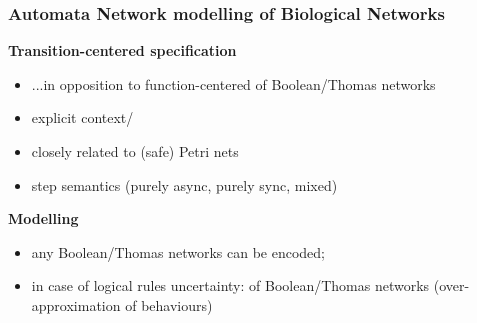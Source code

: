 \begin{frame}
\frametitle{Automata Network modelling of Biological Networks}
\textbf{Transition-centered specification}
\begin{itemize}
\item ...in opposition to function-centered of Boolean/Thomas networks
\item explicit context/ 
\item closely related to (safe) Petri nets
\item step semantics (purely async, purely sync, mixed)
\end{itemize}
\textbf{Modelling}
\begin{itemize}
\item any Boolean/Thomas networks can be encoded;
\item in case of logical rules uncertainty:  of Boolean/Thomas networks (over-approximation of behaviours)
\end{itemize}
\end{frame}

